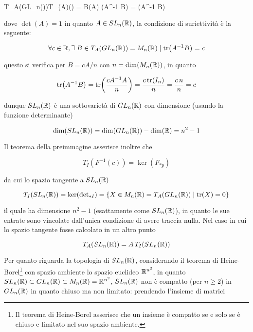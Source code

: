 	{T_{A}(GL_{n}(\R))}{T_{\det(A)}(\R) = \R}
	{B}{\det(A) \tr(A^{-1} B) = \tr(A^{-1} B)}
	
dove $ \det(A) = 1 $ in quanto $ A \in SL_{n}(\mathbb{R}) $, la condizione di suriettività è la seguente:

\begin{equation}
	\forall c \in \mathbb{R}, \exists \; B \in T_{A}(GL_{n}(\mathbb{R})) = M_{n}(\mathbb{R}) \mid \tr(A^{-1} B) = c
\end{equation}

questo si verifica per $ B = c A / n $ con $ n = \dim(M_{n}(\mathbb{R})) $, in quanto

\begin{equation}
	\tr(A^{-1} B) = \tr(\dfrac{c A^{-1} A}{n}) %
	= \dfrac{c \tr(I_{n})}{n} %
	= \dfrac{c \, n}{n} %
	= c
\end{equation}

dunque $ SL_{n}(\mathbb{R}) $ è una sottovarietà di $ GL_{n}(\mathbb{R}) $ con dimensione (usando la funzione determinante)

\begin{equation}
	\dim(SL_{n}(\mathbb{R})) = \dim(GL_{n}(\mathbb{R})) - \dim(\mathbb{R}) = n^{2} - 1
\end{equation}

Il teorema della preimmagine asserisce inoltre che

\begin{equation}
	T_{I}(F^{-1}(c)) = \ker(F_{*p})
\end{equation}

da cui lo spazio tangente a $ SL_{n}(\mathbb{R}) $

\begin{equation}
	T_{I}(SL_{n}(\R)) = \ker({\det}_{*I}) %
	= \{ X \in M_{n}(\R) = T_{A}(GL_{n}(\R)) \mid \tr(X) = 0 \}
\end{equation}

il quale ha dimensione $ n^{2} - 1 $ (esattamente come $ SL_{n}(\mathbb{R}) $), in quanto le sue entrate sono vincolate dall'unica condizione di avere traccia nulla. Nel caso in cui lo spazio tangente fosse calcolato in un altro punto

\begin{equation}
	T_{A}(SL_{n}(\mathbb{R})) = A \, T_{I}(SL_{n}(\mathbb{R}))
\end{equation}

Per quanto riguarda la topologia di $ SL_{n}(\mathbb{R}) $, considerando il teorema di Heine-Borel\footnote{%
	Il teorema di Heine-Borel asserisce che un insieme è compatto se e solo se è chiuso e limitato nel suo spazio ambiente.%
} con spazio ambiente lo spazio euclideo $ \mathbb{R}^{n^{2}} $, in quanto $ SL_{n}(\mathbb{R}) \subset GL_{n}(\mathbb{R}) \subset M_{n}(\mathbb{R}) = \mathbb{R}^{n^{2}} $, $ SL_{n}(\mathbb{R}) $ non è compatto (per $ n \geqslant 2 $) in $ GL_{n}(\mathbb{R}) $ in quanto chiuso ma non limitato: prendendo l'insieme di matrici

